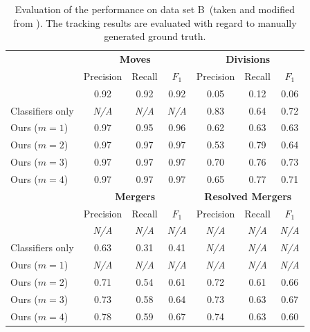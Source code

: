 \begin{table}
    \centering
    \begin{tabular}{l||ccc|ccc}
        \toprule
        & \multicolumn{3}{c|}{\textbf{Moves}} & \multicolumn{3}{c}{\textbf{Divisions}}  \\
        & Precision & Recall & $F_1$& Precision& Recall& $F_{1}$\\
        \hline
        \citep{kausler_12_discrete} 	& 0.92		& 0.92 & 0.92  & 0.05      & 0.12 & 0.06    \\
        Classifiers only 	& \textit{N/A}	& \textit{N/A} & \textit{N/A}  & 0.83      & 0.64 & 0.72    \\
        Ours ($m=1$)						& 0.97        & 0.95 & 0.96  & 0.62     & 0.63 & 0.63    \\  
        Ours ($m=2$)						& 0.97        & 0.97 & 0.97  & 0.53      & 0.79 & 0.64   \\ 
        Ours ($m=3$)						& 0.97        & 0.97 & 0.97  & 0.70      & 0.76 & 0.73    \\ 
        Ours ($m=4$)						& 0.97        & 0.97 & 0.97  & 0.65      & 0.77 & 0.71    \\ 
        \midrule
        & \multicolumn{3}{c|}{\textbf{Mergers} } & \multicolumn{3}{c}{\textbf{Resolved Mergers}} \\
        & Precision& Recall& $F_{1}$ & Precision& Recall& $F_{1}$ \\
        \hline
        \citep{kausler_12_discrete} & \textit{N/A}& \textit{N/A} & \textit{N/A} & \textit{N/A}& \textit{N/A} & \textit{N/A} \\
        Classifiers only & 0.63 & 0.31 & 0.41 & \textit{N/A}& \textit{N/A} & \textit{N/A} \\
        Ours ($m=1$) & \textit{N/A}& \textit{N/A} & \textit{N/A} & \textit{N/A}& \textit{N/A} & \textit{N/A}\\
        Ours ($m=2$) & 0.71 & 0.54 & 0.61 & 0.72 & 0.61 & 0.66 \\
        Ours ($m=3$) & 0.73 & 0.58 & 0.64  & 0.73      & 0.63 & 0.67 \\
        Ours ($m=4$) & 0.78      & 0.59 & 0.67 & 0.74      & 0.63 & 0.60 \\
        \bottomrule
    \end{tabular}
    \caption[Conservation tracking results: Data Set B]{Evaluation of the performance on data set
        B~(taken and modified from \citealp[Table~2]{schiegg_13_conservation}). The tracking results
        are evaluated with regard to manually generated ground truth.}
    \label{tab:gmm-result-b}
\end{table}


